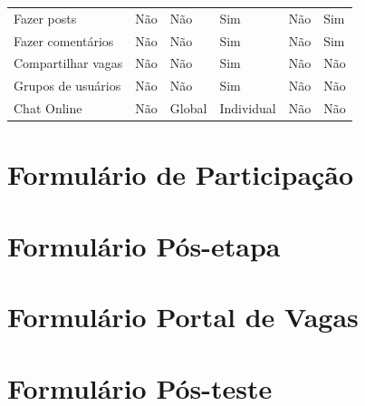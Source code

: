 \begin{landscape}
\begin{table}[h]
\begin{center}
\begin{tabular}{llllll}
        Fazer posts         & Não             & Não               & Sim           & Não     & Sim \\
        Fazer comentários   & Não             & Não               & Sim           & Não     & Sim \\
        Compartilhar vagas  & Não             & Não               & Sim           & Não     & Não \\
        Grupos de usuários  & Não             & Não               & Sim           & Não     & Não \\
        Chat Online         & Não             & Global            & Individual    & Não     & Não \\
        \hline
        
        \end{tabular}
        \end{center}
        \bigskip
        \label{tabelaAvalTrabFinal}
    \end{table}
\end{landscape}

\chapter{Formulário de Participação}
\label{appendFormPortal}


\chapter{Formulário Pós-etapa}
\label{appendFormStepPortal}


\chapter{Formulário Portal de Vagas}
\label{appendFormPDV}


\chapter{Formulário Pós-teste}
\label{appendFormFinalPortal}
